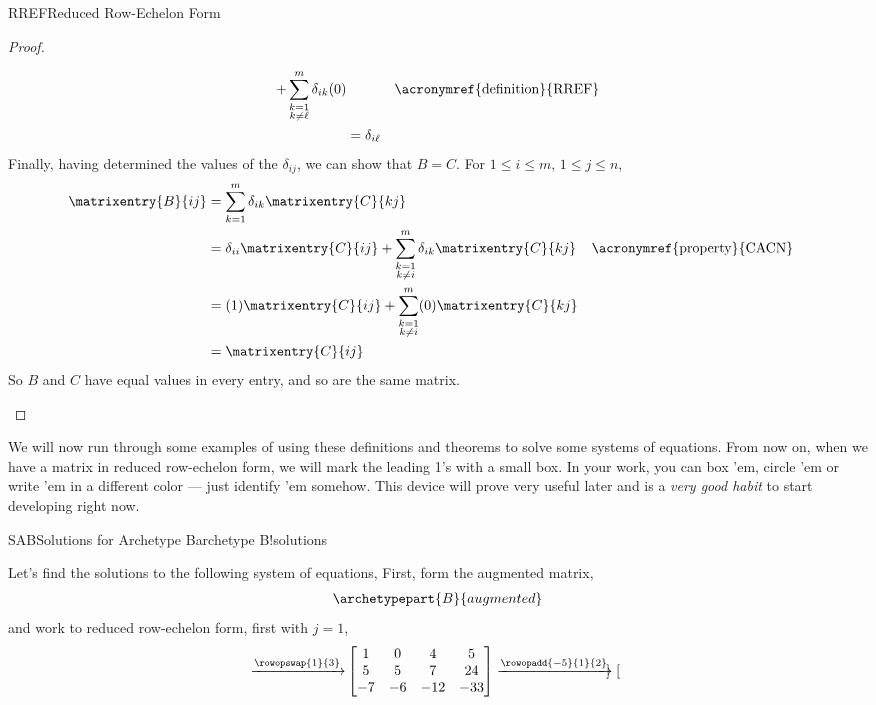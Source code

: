 \begin{subsect}{RREF}{Reduced Row-Echelon Form}
\begin{proof}
\begin{para}
\begin{align*}
+
\sum_{\substack{k=1\\k\neq\ell}}^{m}\delta_{ik}(0)
&&\text{\acronymref{definition}{RREF}}\\
%
&=\delta_{i\ell}
%
\end{align*}
%
Finally, having determined the values of the $\delta_{ij}$, we can show that $B=C$.  For $1\leq i\leq m$, $1\leq j\leq n$,
%
\begin{align*}
\matrixentry{B}{ij}
&=\sum_{k=1}^{m}\delta_{ik}\matrixentry{C}{kj}\\
&=
\delta_{ii}\matrixentry{C}{ij}
+
\sum_{\substack{k=1\\k\neq i}}^{m}\delta_{ik}\matrixentry{C}{kj}
&&\text{\acronymref{property}{CACN}}\\
%
&=
(1)\matrixentry{C}{ij}
+
\sum_{\substack{k=1\\k\neq i}}^{m}(0)\matrixentry{C}{kj}\\
%
&=\matrixentry{C}{ij}
%
\end{align*}
%
So $B$ and $C$ have equal values in every entry, and so are the same matrix.\end{para}
%
\end{proof}
%
\begin{para}We will now run through some examples of using these definitions and theorems to solve some systems of equations.  From now on, when we have a matrix in reduced row-echelon form, we will mark the leading 1's with a small box.  In your work, you can box 'em, circle 'em or write 'em in a different color --- just identify 'em somehow.  This device will prove very useful later and is a \emph{very good habit} to start developing right now.\end{para}
%
\begin{example}{SAB}{Solutions for Archetype B}{archetype B!solutions}
\begin{para}Let's find the solutions to the following system of equations,
First, form the augmented matrix,
\begin{align*}
\archetypepart{B}{augmented}\end{align*}
and work to reduced row-echelon form, first with $j=1$,
\begin{align*}
\xrightarrow{\rowopswap{1}{3}}
&
\begin{bmatrix}
1&0&4&5\\
5&5&7&24\\
-7&-6&-12&-33
\end{bmatrix}
%
\xrightarrow{\rowopadd{-5}{1}{2}}
\begin{bmatrix}

\end{bmatrix}
\end{align*}
\end{para}
\end{example}
\end{subsect}
